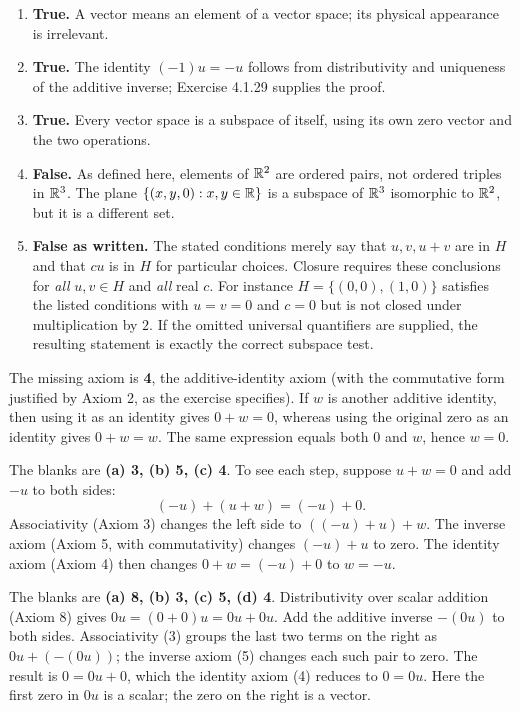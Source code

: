 \begin{enumerate}[label=(\alph*)]
\item \textbf{True.} A vector means an element of a vector space; its
physical appearance is irrelevant.
\item \textbf{True.} The identity $(-1)u=-u$ follows from distributivity
and uniqueness of the additive inverse; Exercise 4.1.29 supplies the proof.
\item \textbf{True.} Every vector space is a subspace of itself, using
its own zero vector and the two operations.
\item \textbf{False.} As defined here, elements of $\mathbb{R}^2$ are ordered
pairs, not ordered triples in $\mathbb{R}^3$. The plane $\{(x,y,0):x,y\in\mathbb{R}\}$
is a subspace of $\mathbb{R}^3$ isomorphic to $\mathbb{R}^2$, but it is a different set.
\item \textbf{False as written.} The stated conditions merely say that
$u,v,u+v$ are in $H$ and that $cu$ is in $H$ for particular choices. Closure
requires these conclusions for \emph{all} $u,v\in H$ and \emph{all} real $c$.
For instance $H=\{(0,0),(1,0)\}$ satisfies the listed conditions with
$u=v=0$ and $c=0$ but is not closed under multiplication by $2$.
If the omitted universal quantifiers are supplied, the resulting statement
is exactly the correct subspace test.
\end{enumerate}

The missing axiom is \textbf{4}, the additive-identity axiom (with the
commutative form justified by Axiom 2, as the exercise specifies).
If $w$ is another additive identity, then using it as an identity gives
$0+w=0$, whereas using the original zero as an identity gives $0+w=w$.
The same expression equals both $0$ and $w$, hence $w=0$.

The blanks are \textbf{(a) 3, (b) 5, (c) 4}.
To see each step, suppose $u+w=0$ and add $-u$ to both sides:
\[
 (-u)+(u+w)=(-u)+0.
\]
Associativity (Axiom 3) changes the left side to $((-u)+u)+w$.
The inverse axiom (Axiom 5, with commutativity) changes $(-u)+u$ to zero.
The identity axiom (Axiom 4) then changes $0+w=(-u)+0$ to $w=-u$.

The blanks are \textbf{(a) 8, (b) 3, (c) 5, (d) 4}.
Distributivity over scalar addition (Axiom 8) gives
$0u=(0+0)u=0u+0u$. Add the additive inverse $-(0u)$ to both sides.
Associativity (3) groups the last two terms on the right as
$0u+(-(0u))$; the inverse axiom (5) changes each such pair to zero.
The result is $0=0u+0$, which the identity axiom (4) reduces to $0=0u$.
Here the first zero in $0u$ is a scalar; the zero on the right is a vector.

